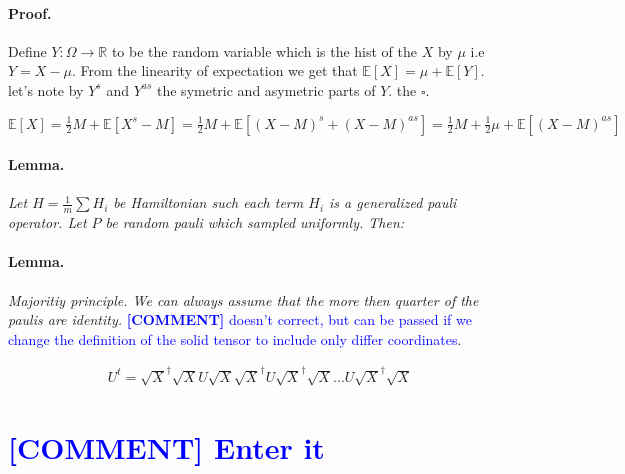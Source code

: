 \documentclass{article}
\newcommand{\commentt}[1]{\textcolor{blue}{ \textbf{[COMMENT]} #1}}
\newcommand{\ctt}[1]{\commentt{#1}}
\begin{document}
\begin{multicols*}{2}
\paragraph{Proof.} Define \(Y : \Omega \rightarrow \mathbb{R} \) to be the random  variable which is the hist of the \(X\) by \(\mu\) i.e \(Y = X -\mu\). From the linearity of expectation we get that \(\mathbb{E}[X] = \mu + \mathbb{E}[Y]\). let's note by \(Y^{s}\) and \(Y^{as}\) the symetric and asymetric parts of \(Y\). the \(\square\). 

\( \mathbb{E}[X] = \frac{1}{2}M + \mathbb{E}[X^{s} - M] = \frac{1}{2}M + \mathbb{E}[(X-M)^{s} + (X-M)^{as}] = \frac{1}{2}M + \frac{1}{2}\mu + \mathbb{E}[(X-M)^{as}] \) 

\paragraph{Lemma.} \textit{Let \( H = \frac{1}{m}\sum{H_{i}}\) be Hamiltonian such each term \(H_{i}\) is a generalized pauli operator. Let \(P\) be random pauli which sampled uniformly. Then:   }


\paragraph{Lemma.} \textit{Majoritiy principle. We can always assume that the more then quarter of the paulis are identity. } \ctt{ doesn't correct, but can be passed if we change the definition of the solid tensor to include only differ coordinates}.

\begin{equation*}
    \begin{split}
        U^{t} = \sqrt{X}^\dagger\sqrt{X}U\sqrt{X}\sqrt{X}^\dagger U \sqrt{X}^\dagger\sqrt{X} ... U \sqrt{X}^\dagger\sqrt{X}
    \end{split}
\end{equation*}

\section{\ctt{Enter it}}


\end{multicols*}
\end{document}
